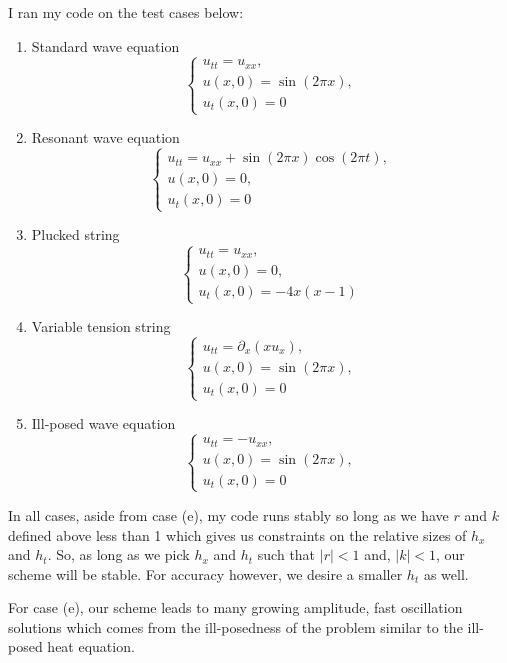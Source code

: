 \documentclass[a4paper,12pt]{article}
\newcommand{\abs}[1]{\left| #1 \right|}
\begin{document}
\begin{enumerate}[label = (\arabic*)]
	I ran my code on the test cases below:
	\begin{enumerate}[label = (\alph*)]
		\item Standard wave equation
			\[
				\begin{cases}
					u_{tt} = u_{xx}, \\
					u(x,0) = \sin(2\pi x), \\
					u_t(x,0) = 0
				\end{cases}
			\]
			
		\item Resonant wave equation
			\[
				\begin{cases}
					u_{tt} = u_{xx} + \sin(2\pi x) \cos(2\pi t), \\
					u(x,0) = 0, \\
					u_t(x,0) = 0
				\end{cases}
			\]
			
		\item Plucked string
			\[
				\begin{cases}
					u_{tt} = u_{xx}, \\
					u(x,0) = 0, \\
					u_t(x,0) = -4x(x - 1)
				\end{cases}
			\]
			
		\item Variable tension string
			\[
				\begin{cases}
					u_{tt} = \partial_x(x u_x), \\
					u(x,0) = \sin(2\pi x), \\
					u_t(x,0) = 0
				\end{cases}
			\]
		
		\item Ill-posed wave equation
			\[
				\begin{cases}
					u_{tt} = -u_{xx}, \\
					u(x,0) = \sin(2\pi x), \\
					u_t(x,0) = 0
				\end{cases}
			\]
	\end{enumerate}
	
	In all cases, aside from case (e), my code runs stably so long as we have $ r $ and $ k $ defined above less than 1 which gives us constraints on the relative sizes of $ h_x $ and $ h_t $. So, as long as we pick $ h_x $ and $ h_t $ such that $ \abs{r} < 1 $ and, $ \abs{k} < 1 $, our scheme will be stable. For accuracy however, we desire a smaller $ h_t $ as well. 
	
	For case (e), our scheme leads to many growing amplitude, fast oscillation solutions which comes from the ill-posedness of the problem similar to the ill-posed heat equation.
\end{enumerate}
\end{document}

